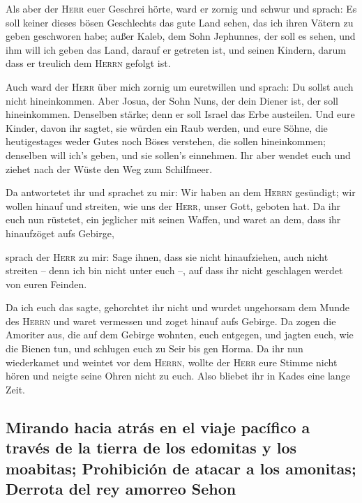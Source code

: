  Als aber der \textsc{Herr} euer Geschrei hörte, ward er
zornig und schwur und sprach:  Es soll keiner dieses
bösen Geschlechts das gute Land sehen, das ich ihren Vätern zu geben
geschworen habe;  außer Kaleb, dem Sohn Jephunnes, der
soll es sehen, und ihm will ich geben das Land, darauf er getreten ist,
und seinen Kindern, darum dass er treulich dem \textsc{Herrn} gefolgt
ist.

 Auch ward der \textsc{Herr} über mich zornig um
euretwillen und sprach: Du sollst auch nicht hineinkommen.
 Aber Josua, der Sohn Nuns, der dein Diener ist, der soll
hineinkommen. Denselben stärke; denn er soll Israel das Erbe austeilen.
 Und eure Kinder, davon ihr sagtet, sie würden ein Raub
werden, und eure Söhne, die heutigestages weder Gutes noch Böses
verstehen, die sollen hineinkommen; denselben will ich's geben, und sie
sollen's einnehmen.  Ihr aber wendet euch und ziehet nach
der Wüste den Weg zum Schilfmeer.

 Da antwortetet ihr und sprachet zu mir: Wir haben an dem
\textsc{Herrn} gesündigt; wir wollen hinauf und streiten, wie uns der
\textsc{Herr}, unser Gott, geboten hat. Da ihr euch nun rüstetet, ein
jeglicher mit seinen Waffen, und waret an dem, dass ihr hinaufzöget aufs
Gebirge,

 sprach der \textsc{Herr} zu mir: Sage ihnen, dass sie
nicht hinaufziehen, auch nicht streiten -- denn ich bin nicht unter euch
--, auf dass ihr nicht geschlagen werdet von euren Feinden.

 Da ich euch das sagte, gehorchtet ihr nicht und wurdet
ungehorsam dem Munde des \textsc{Herrn} und waret vermessen und zoget
hinauf aufs Gebirge.  Da zogen die Amoriter aus, die auf
dem Gebirge wohnten, euch entgegen, und jagten euch, wie die Bienen tun,
und schlugen euch zu Seir bis gen Horma.  Da ihr nun
wiederkamet und weintet vor dem \textsc{Herrn}, wollte der \textsc{Herr}
eure Stimme nicht hören und neigte seine Ohren nicht zu euch.
 Also bliebet ihr in Kades eine lange Zeit.

\hypertarget{mirando-hacia-atruxe1s-en-el-viaje-pacuxedfico-a-travuxe9s-de-la-tierra-de-los-edomitas-y-los-moabitas-prohibiciuxf3n-de-atacar-a-los-amonitas-derrota-del-rey-amorreo-sehon}{%
\subsection{Mirando hacia atrás en el viaje pacífico a través de la
tierra de los edomitas y los moabitas; Prohibición de atacar a los
amonitas; Derrota del rey amorreo
Sehon}\label{mirando-hacia-atruxe1s-en-el-viaje-pacuxedfico-a-travuxe9s-de-la-tierra-de-los-edomitas-y-los-moabitas-prohibiciuxf3n-de-atacar-a-los-amonitas-derrota-del-rey-amorreo-sehon}}

